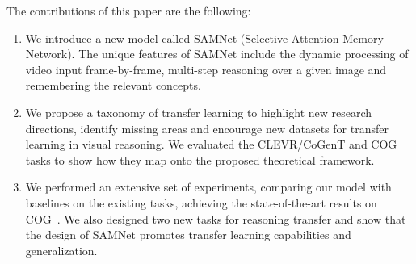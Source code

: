 \noindent The contributions of this paper are the following:
\begin{enumerate}
	\item We introduce a new model called SAMNet (Selective Attention Memory Network).
	The unique features of SAMNet include the dynamic processing of video input frame-by-frame, multi-step reasoning over a given image and remembering the relevant concepts.
	
	\item We propose a taxonomy of transfer learning to highlight new research directions, identify missing areas and encourage new datasets for transfer learning in visual reasoning. We evaluated the CLEVR/CoGenT and COG tasks to show how they map onto the proposed theoretical framework.
	\item We performed an extensive set of experiments, comparing our model with baselines on the existing tasks, achieving the state-of-the-art results on COG~\cite{yang2018dataset}. We also designed two new tasks for reasoning transfer and show that the design of SAMNet  promotes transfer learning capabilities and generalization.
	
\end{enumerate}